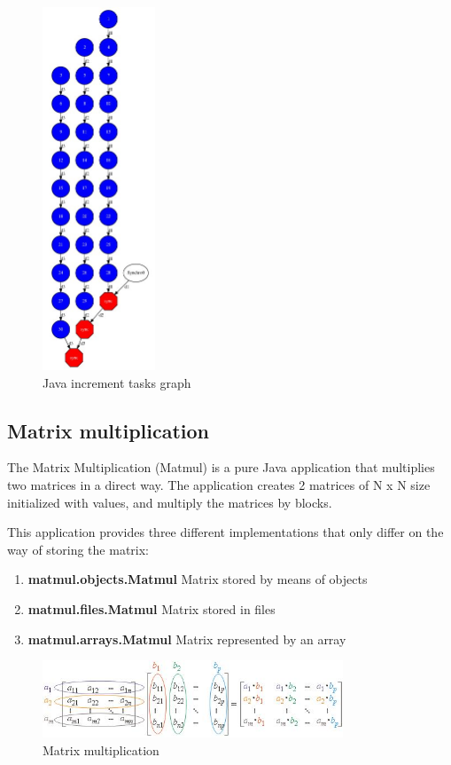 \begin{figure}[ht!]
  \centering
    \includegraphics[width=0.3\textwidth]{./Sections/2_Java/Figures/increment_graph.jpeg}
    \caption{Java increment tasks graph} 
    \label{fig:increment_java}
\end{figure}

\newpage
\subsection{Matrix multiplication}
The Matrix Multiplication (Matmul) is a pure Java application that multiplies two matrices in a direct way. 
The application creates 2 matrices of N x N size initialized with values, and multiply the matrices by blocks.

This application provides three different implementations that only differ on the way of storing the matrix:
\begin{enumerate}
 \item \textbf{matmul.objects.Matmul} Matrix stored by means of objects
 \item \textbf{matmul.files.Matmul} Matrix stored in files
 \item \textbf{matmul.arrays.Matmul} Matrix represented by an array
\end{enumerate}

\begin{figure}[ht!]
  \centering
    \includegraphics[width=0.8\textwidth]{./Sections/2_Java/Figures/matrix.jpeg}
    \caption{Matrix multiplication} 
    \label{fig:matrix}
\end{figure}

